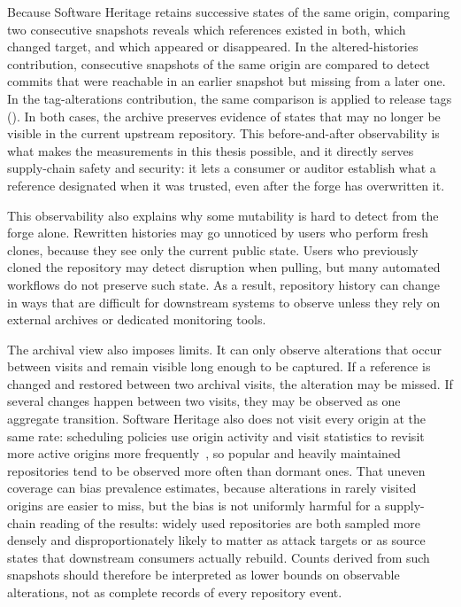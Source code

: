Because Software Heritage retains successive states of the same origin, comparing two consecutive snapshots reveals which references existed in both, which changed target, and which appeared or disappeared.
In the altered-histories contribution, consecutive snapshots of the same origin are compared to detect commits that were reachable in an earlier snapshot but missing from a later one.
In the tag-alterations contribution, the same comparison is applied to release tags ().
In both cases, the archive preserves evidence of states that may no longer be visible in the current upstream repository.
This before-and-after observability is what makes the measurements in this thesis possible, and it directly serves supply-chain safety and security: it lets a consumer or auditor establish what a reference designated when it was trusted, even after the forge has overwritten it.

This observability also explains why some mutability is hard to detect from the forge alone.
Rewritten histories may go unnoticed by users who perform fresh clones, because they see only the current public state.
Users who previously cloned the repository may detect disruption when pulling, but many automated workflows do not preserve such state.
As a result, repository history can change in ways that are difficult for downstream systems to observe unless they rely on external archives or dedicated monitoring tools.

The archival view also imposes limits.
It can only observe alterations that occur between visits and remain visible long enough to be captured.
If a reference is changed and restored between two archival visits, the alteration may be missed.
If several changes happen between two visits, they may be observed as one aggregate transition.
Software Heritage also does not visit every origin at the same rate: scheduling policies use origin activity and visit statistics to revisit more active origins more frequently~\cite{swh_scheduler_architecture}, so popular and heavily maintained repositories tend to be observed more often than dormant ones.
That uneven coverage can bias prevalence estimates, because alterations in rarely visited origins are easier to miss, but the bias is not uniformly harmful for a supply-chain reading of the results: widely used repositories are both sampled more densely and disproportionately likely to matter as attack targets or as source states that downstream consumers actually rebuild.
Counts derived from such snapshots should therefore be interpreted as lower bounds on observable alterations, not as complete records of every repository event.

